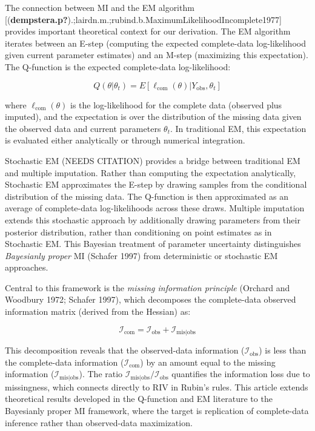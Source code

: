 \documentclass[
]{article}
\begin{document}
The connection between MI and the EM algorithm
{[}(\textbf{dempstera.p?}).;lairdn.m.;rubind.b.MaximumLikelihoodIncomplete1977{]}
provides important theoretical context for our derivation. The EM
algorithm iterates between an E-step (computing the expected
complete-data log-likelihood given current parameter estimates) and an
M-step (maximizing this expectation). The Q-function is the expected
complete-data log-likelihood:

\[Q(\theta|\theta_t) = E[\ell_{\text{com}}(\theta) | Y_{\text{obs}}, \theta_t]\]

where \(\ell_{\text{com}}(\theta)\) is the log-likelihood for the
complete data (observed plus imputed), and the expectation is over the
distribution of the missing data given the observed data and current
parameters \(\theta_t\). In traditional EM, this expectation is
evaluated either analytically or through numerical integration.

Stochastic EM (NEEDS CITATION) provides a bridge between traditional EM
and multiple imputation. Rather than computing the expectation
analytically, Stochastic EM approximates the E-step by drawing samples
from the conditional distribution of the missing data. The Q-function is
then approximated as an average of complete-data log-likelihoods across
these draws. Multiple imputation extends this stochastic approach by
additionally drawing parameters from their posterior distribution,
rather than conditioning on point estimates as in Stochastic EM. This
Bayesian treatment of parameter uncertainty distinguishes
\emph{Bayesianly proper} MI (Schafer 1997) from deterministic or
stochastic EM approaches.

Central to this framework is the \emph{missing information principle}
(Orchard and Woodbury 1972; Schafer 1997), which decomposes the
complete-data observed information matrix (derived from the Hessian) as:

\[\mathcal{I}_{\text{com}} = \mathcal{I}_{\text{obs}} + \mathcal{I}_{\text{mis}|\text{obs}}\]

This decomposition reveals that the observed-data information
(\(\mathcal{I}_{\text{obs}}\)) is less than the complete-data
information (\(\mathcal{I}_{\text{com}}\)) by an amount equal to the
missing information (\(\mathcal{I}_{\text{mis}|\text{obs}}\)). The ratio
\(\mathcal{I}_{\text{mis}|\text{obs}} / \mathcal{I}_{\text{obs}}\)
quantifies the information loss due to missingness, which connects
directly to RIV in Rubin's rules. This article extends theoretical
results developed in the Q-function and EM literature to the Bayesianly
proper MI framework, where the target is replication of complete-data
inference rather than observed-data maximization.
\end{document}
